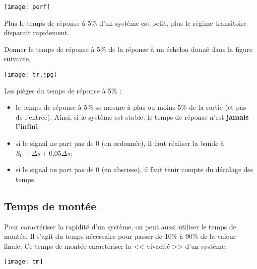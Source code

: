 \begin{center}
%
\texttt{[image: perf]}
\end{center}

\begin{resultat}
Plus le temps de réponse à 5\% d'un système est petit, plus le régime transitoire disparaît rapidement. 
\end{resultat}

\begin{exemple}
Donner le temps de réponse à 5\% de la réponse à un échelon donné dans la figure suivante. 


\begin{minipage}[c]{.5\linewidth}
\begin{center}
%
\texttt{[image: tr.jpg]}
\end{center}
\end{minipage} \hfill
\begin{minipage}[c]{.4\linewidth}
Les pièges du temps de réponse à 5\% :
\begin{itemize}
\item le temps de réponse à 5\% se mesure à plus ou moins 5\% de la sortie (et pas de l'entrée). Ainsi, si le système est stable, le temps de réponse n'est \textbf{jamais l'infini};
\item si le signal ne part pas de 0 (en ordonnée), il faut réaliser la bande à $S_0+\Delta s \pm 0.05\Delta s$;
\item si le signal ne part pas de 0 (en abscisse), il faut tenir compte du décalage des temps.
\end{itemize}
\end{minipage} 
\end{exemple}

\subsection{Temps de montée}


\begin{minipage}[c]{.48\linewidth}
Pour caractériser la rapidité d'un système, on peut aussi utiliser le temps de montée. Il s'agit du temps nécessaire pour passer de 10\% à 90\% de la valeur finale. Ce temps de montée caractériser la << vivacité >> d'un système. 
\end{minipage} \hfill
\begin{minipage}[c]{.4\linewidth}
\begin{center}
%
\texttt{[image: tm]}
\end{center}
\end{minipage} 
